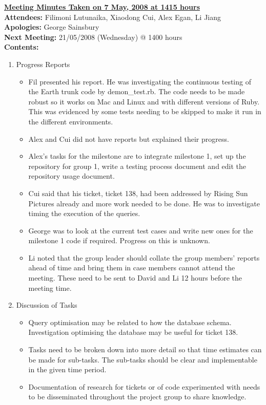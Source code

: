 \documentclass{letter}
\begin{document}
{\large \textbf{\underline{Meeting Minutes Taken on 7 May, 2008 at 1415 hours}}}\\

\textbf{Attendees:} Filimoni Lutunaika, Xiaodong Cui, Alex Egan, Li Jiang\\
\textbf{Apologies:} George Sainsbury\\
\textbf{Next Meeting:} 21/05/2008 (Wednesday) @ 1400 hours\\
\textbf{Contents:}

\begin{enumerate}
\item Progress Reports
	\begin{itemize}
	\item Fil presented his report. He was investigating the continuous testing of the Earth trunk code by demon\_test.rb. The code needs to be made robust so it works on Mac and Linux and with different versions of Ruby. This was evidenced by some tests needing to be skipped to make it run in the different environments.
	\item Alex and Cui did not have reports but explained their progress.
	\item Alex's tasks for the milestone are to integrate milestone 1, set up the repository for group 1, write a testing process document and edit the repository usage document.
	\item Cui said that his ticket, ticket 138, had been addressed by Rising Sun Pictures already and more work needed to be done. He was to investigate timing the execution of the queries.
	\item George was to look at the current test cases and write new ones for the milestone 1 code if required. Progress on this is unknown.
	\item Li noted that the group leader should collate the group members' reports ahead of time and bring them in case members cannot attend the meeting. These need to be sent to David and Li 12 hours before the meeting time.
	\end{itemize}
\item Discussion of Tasks
	\begin{itemize}
	\item Query optimisation may be related to how the database schema. Investigation optimising the database may be useful for ticket 138.
	\item Tasks need to be broken down into more detail so that time estimates can be made for sub-tasks. The sub-tasks should be clear and implementable in the given time period.
	\item Documentation of research for tickets or of code experimented with needs to be disseminated throughout the project group to share knowledge.
	\end{itemize}
\end{enumerate}
\end{document}
